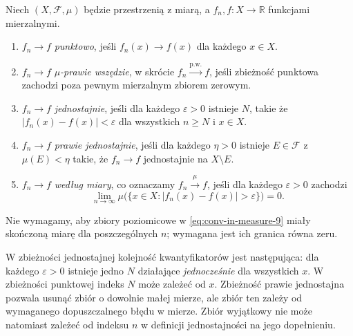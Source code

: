 \begin{definicja}
\label{def:five-convergences}
Niech $(X,\mathcal F,\mu)$ będzie przestrzenią z miarą,
a $f_n,f:X\to\mathbb R$ funkcjami mierzalnymi.
\begin{enumerate}[label=\textup{(\roman*)}]
\item $f_n\to f$ \emph{punktowo}, jeśli
$f_n(x)\to f(x)$ dla każdego $x\in X$.
\item $f_n\to f$ \emph{$\mu$-prawie wszędzie}, w skrócie
$f_n\xrightarrow{\mathrm{p.w.}}f$, jeśli zbieżność
punktowa zachodzi poza pewnym mierzalnym zbiorem zerowym.
\item $f_n\to f$ \emph{jednostajnie}, jeśli dla każdego
$\varepsilon>0$ istnieje $N$, takie że
$|f_n(x)-f(x)|<\varepsilon$ dla wszystkich $n\ge N$
i $x\in X$.
\item $f_n\to f$ \emph{prawie jednostajnie}, jeśli dla każdego
$\eta>0$ istnieje $E\in\mathcal F$ z $\mu(E)<\eta$
takie, że $f_n\to f$ jednostajnie na $X\setminus E$.
\item $f_n\to f$ \emph{według miary}, co oznaczamy
$f_n\xrightarrow{\mu}f$, jeśli dla każdego $\varepsilon>0$
zachodzi
\begin{equation}\label{eq:conv-in-measure-9}
\lim_{n\to\infty}\mu\bigl(\{x\in X:
|f_n(x)-f(x)|>\varepsilon\}\bigr)=0.
\end{equation}
\end{enumerate}
Nie wymagamy, aby zbiory poziomicowe w
\eqref{eq:conv-in-measure-9} miały skończoną miarę dla
poszczególnych $n$; wymagana jest ich granica równa zeru.
\end{definicja}

\begin{uwaga}
W zbieżności jednostajnej kolejność kwantyfikatorów jest
następująca: dla każdego $\varepsilon>0$ istnieje jedno $N$
działające \emph{jednocześnie} dla wszystkich $x$. W zbieżności
punktowej indeks $N$ może zależeć od $x$. Zbieżność prawie
jednostajna pozwala usunąć zbiór o dowolnie małej mierze,
ale zbiór ten zależy od wymaganego dopuszczalnego błędu w mierze.
Zbiór wyjątkowy nie może natomiast zależeć od indeksu $n$
w definicji jednostajności na jego dopełnieniu.
\end{uwaga}

